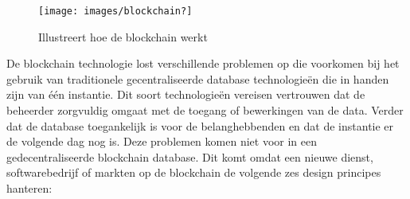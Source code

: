 \begin{figure}[h]
    \begin{center}
        \texttt{[image: images/blockchain?]}
        \caption{Illustreert hoe de blockchain werkt \cite{howBlockchainWorks}}
        \label{fig:blockchain?}
    \end{center}
\end{figure}

De blockchain technologie lost verschillende problemen op die voorkomen bij het gebruik van traditionele gecentraliseerde database technologieën die in handen zijn van één instantie. Dit soort technologieën vereisen vertrouwen dat de beheerder zorgvuldig omgaat met de toegang of bewerkingen van de data. Verder dat de database toegankelijk is voor de belanghebbenden en dat de instantie er de volgende dag nog is. Deze problemen komen niet voor in een gedecentraliseerde blockchain database. Dit komt omdat een nieuwe dienst, softwarebedrijf of markten op de blockchain de volgende zes design principes \cite{blockRev} hanteren:
